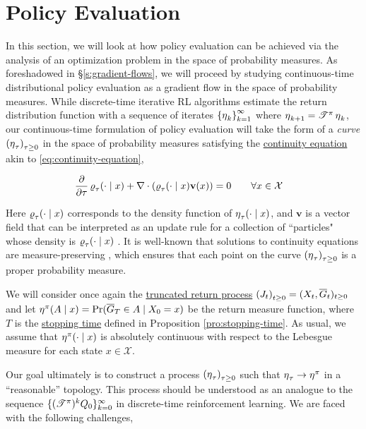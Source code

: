 \section{Policy Evaluation}\label{s:policy-evaluation}
In this section, we will look at how policy evaluation can be achieved
via the analysis of an
optimization problem in the space of probability measures. As foreshadowed in
\S\ref{s:gradient-flows}, we will proceed by studying continuous-time
distributional policy evaluation as a gradient flow in the space of probability
measures. While discrete-time iterative RL algorithms estimate the return
distribution function with a sequence of iterates
$\indexedint{k}{\infty}{\returnmeasure}$ where $\returnmeasure_{k+1} =
\bellmanoperator\returnmeasure_k$, our continuous-time formulation of
policy evaluation will take the form of a \emph{curve}
$\indexedabove{\tau}{\returnmeasure}$ in the space of
probability measures satisfying the \hyperref[eq:continuity-equation]{continuity
equation} akin to \eqref{eq:continuity-equation},

\begin{align*}
  \partialderiv{}{\tau}\returndistribution_\tau(\cdot\mid x) +
  \nabla\cdot(\returndistribution_\tau(\cdot\mid x)\mathbf{v}(x)) &= 0\qquad
  \forall x\in\mathcal{X}
\end{align*}

Here $\returndistribution_\tau(\cdot\mid x)$ corresponds to the density function of
$\returnmeasure_\tau(\cdot\mid x)$, and $\mathbf{v}$ is a vector field that can be
interpreted as an update rule for a collection of ``particles" whose density is
$\returndistribution_\tau(\cdot\mid x)$ \citep{santambrogio2015optimal}. It is
well-known that solutions to continuity equations are measure-preserving
\citep{ullrich2011time}, which ensures that each point on the curve
$\indexedabove{\tau}{\returnmeasure}$ is a proper probability measure.

We will consider once again the
\hyperref[def:truncated-return]{truncated return process}
$\indexedabove{t}{J}=(X_t, \overline{G}_t)_{t\geq 0}$ and let
$\returnmeasure^\pi(A\mid x) = \Pr(\overline{G}_T\in A\mid X_0 = x)$ be
the return measure function, where $T$ is the
\hyperref[def:stopping-time]{stopping time} defined in Proposition
\ref{pro:stopping-time}. As usual, we assume that
$\returnmeasure^\pi(\cdot\mid x)$ is absolutely continuous with
respect to the Lebesgue measure for each state
$x\in\mathcal{X}$.

Our goal ultimately is to construct a process
$\indexedabove{\tau}{\returnmeasure}$ such that
$\returnmeasure_\tau\to\returnmeasure^\pi$ in a ``reasonable''
topology. This process should be understood as an analogue to the sequence
$\{(\bellmanoperator)^kQ_0\}_{k=0}^\infty$ in discrete-time reinforcement
learning. We are faced with the following challenges,

